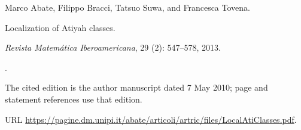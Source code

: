 Marco Abate, Filippo Bracci, Tatsuo Suwa, and Francesca Tovena.

\newblock Localization of Atiyah classes.

\newblock \emph{Revista Matem\'atica Iberoamericana}, 29 (2):
  547--578, 2013.

\newblock {}.

\newblock The cited edition is the author manuscript dated 7 May 2010;
  page and statement references use that edition.

\newblock URL \url{https://pagine.dm.unipi.it/abate/articoli/artric/files/LocalAtiClasses.pdf}.
